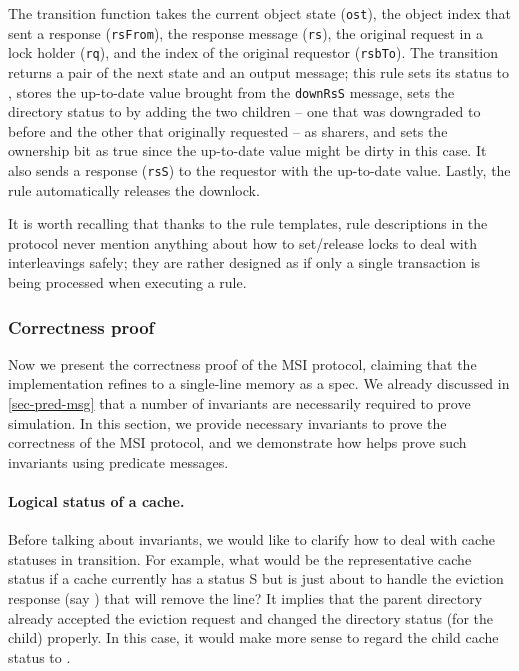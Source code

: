 \documentclass[sigplan,10pt,review,anonymous,screen]{acmart}\settopmatter{printfolios=true,printccs=false,printacmref=false}
\def\slstinline{\lstinline[basicstyle=\ttfamily\small]}
\begin{document}
The transition function takes the current object state (\slstinline{ost}), the object index that sent a response (\slstinline{rsFrom}), the response message (\slstinline{rs}), the original request in a lock holder (\slstinline{rq}), and the index of the original requestor (\slstinline{rsbTo}).
The transition returns a pair of the next state and an output message; this rule sets its status to \stS{}, stores the up-to-date value brought from the \slstinline{downRsS} message, sets the directory status to \stS{} by adding the two children -- one that was downgraded to \stS{} before and the other that originally requested \stS{} -- as sharers, and sets the ownership bit as true since the up-to-date value might be dirty in this case.
It also sends a response (\slstinline{rsS}) to the requestor with the up-to-date value. Lastly, the rule automatically releases the downlock.

It is worth recalling that thanks to the rule templates, rule descriptions in the protocol never mention anything about how to set/release locks to deal with interleavings safely; they are rather designed as if only a single transaction is being processed when executing a rule.

\subsubsection{Correctness proof}
\label{sec-msi-proof}

Now we present the correctness proof of the MSI protocol, claiming that the implementation refines to a single-line memory as a spec.
We already discussed in \autoref{sec-pred-msg} that a number of invariants are necessarily required to prove simulation.
In this section, we provide necessary invariants to prove the correctness of the MSI protocol, and we demonstrate how \hemiola{} helps prove such invariants using predicate messages.

\paragraph{Logical status of a cache.}
Before talking about invariants, we would like to clarify how to deal with cache statuses in transition.
For example, what would be the representative cache status if a cache currently has a status S but is just about to handle the eviction response (say ) that will remove the line?
It implies that the parent directory already accepted the eviction request and changed the directory status (for the child) properly.
In this case, it would make more sense to regard the child cache status to \stI{}.
\end{document}
